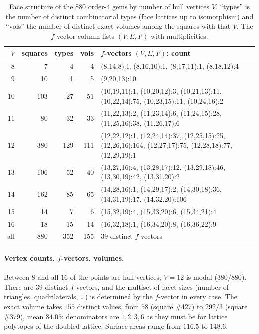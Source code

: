 \begin{table}[htbp]
\centering
\caption{Face structure of the $880$ order-$4$ gems by number of hull
vertices $V$.  ``types'' is the number of distinct combinatorial types (face
lattices up to isomorphism) and ``vols'' the number of distinct exact
volumes among the squares with that $V$.  The $f$-vector column lists
$(V,E,F)$ with multiplicities.}
\label{tab:gem-fvectors}
\footnotesize
\begin{tabular}{rrrrp{7.6cm}}
\toprule
$V$ & squares & types & vols & $f$-vectors $(V,E,F)$: count \\
\midrule
8 & 7 & 4 & 4 & (8,14,8):1, (8,16,10):1, (8,17,11):1, (8,18,12):4 \\
9 & 10 & 1 & 5 & (9,20,13):10 \\
10 & 103 & 27 & 51 & (10,19,11):1, (10,20,12):3, (10,21,13):11, (10,22,14):75, (10,23,15):11, (10,24,16):2 \\
11 & 80 & 32 & 33 & (11,22,13):2, (11,23,14):6, (11,24,15):28, (11,25,16):38, (11,26,17):6 \\
12 & 380 & 129 & 111 & (12,22,12):1, (12,24,14):37, (12,25,15):25, (12,26,16):164, (12,27,17):75, (12,28,18):77, (12,29,19):1 \\
13 & 106 & 52 & 40 & (13,27,16):4, (13,28,17):12, (13,29,18):46, (13,30,19):42, (13,31,20):2 \\
14 & 162 & 85 & 65 & (14,28,16):1, (14,29,17):2, (14,30,18):36, (14,31,19):17, (14,32,20):106 \\
15 & 14 & 7 & 6 & (15,32,19):4, (15,33,20):6, (15,34,21):4 \\
16 & 18 & 15 & 14 & (16,32,18):1, (16,34,20):8, (16,36,22):9 \\
\midrule
all & 880 & 352 & 155 & 39 distinct $f$-vectors \\
\bottomrule
\end{tabular}
\end{table}

\paragraph{Vertex counts, $f$-vectors, volumes.}
Between $8$ and all $16$ of the points are hull vertices; $V=12$ is modal
($380/880$).  There are $39$ distinct $f$-vectors, and the multiset of facet
sizes (number of triangles, quadrilaterals, \dots) is determined by the
$f$-vector in every case.  The exact volume takes $155$ distinct values, from
$58$ (square \#427) to $292/3$ (square \#379), mean $84.05$; denominators are
$1,2,3,6$ as they must be for lattice polytopes of the doubled lattice.
Surface areas range from $116.5$ to $148.6$.


